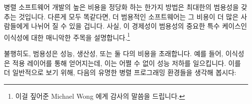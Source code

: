 병렬 소프트웨어 개발의 높은 비용을 정당화 하는 한가지 방법은 최대한의 범용성을
갖추는 것입니다.
다른게 모두 똑같다면, 더 범용적인 소프트웨어는 그 비용이 더 많은 사람들에게
나뉘어 질 수 있을 겁니다.
사실, 이 경제성이 범용성의 중요한 특수 케이스인 이식성에 대한 매니악한 주목을
설명합니다.\footnote{
	이걸 짚어준 Michael Wong 에게 감사의 말씀을 드립니다.}

불행히도, 범용성은 성능, 생산성, 또는 둘 다의 비용을 초래합니다.
예를 들어, 이식성은 적용 레이어를 통해 얻어지는데, 이는 어쩔 수 없이 성능
저하를 일으킵니다.
이를 더 일반적으로 보기 위해, 다음의 유명한 병렬 프로그래밍 환경들을 생각해
봅시다:

